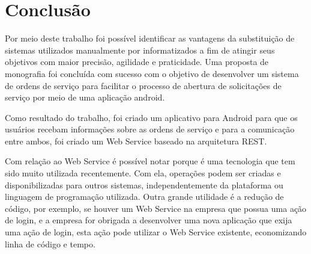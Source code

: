 \chapter{Conclusão}
Por meio deste trabalho foi possível identificar as vantagens da substituição de sistemas utilizados manualmente por informatizados a fim de atingir seus objetivos com maior precisão, agilidade e praticidade. Uma proposta de monografia foi concluída com sucesso com o objetivo de desenvolver um sistema de ordens de serviço para facilitar o processo de abertura de solicitações de serviço por meio de uma aplicação android.

Como resultado do trabalho, foi criado um aplicativo para Android para que os usuários recebam informações sobre as ordens de serviço e para a comunicação entre ambos, foi criado um Web Service baseado na arquitetura REST.

Com relação ao Web Service é possível notar porque é uma tecnologia que tem sido muito utilizada recentemente. Com ela, operações podem ser criadas e disponibilizadas para outros sistemas, independentemente da plataforma ou linguagem de programação utilizada. Outra grande utilidade é a redução de código, por exemplo, se houver um Web Service na empresa que possua uma ação de login, e a empresa for obrigada a desenvolver uma nova aplicação que exija uma ação de login, esta ação pode utilizar o Web Service existente, economizando linha de código e tempo.